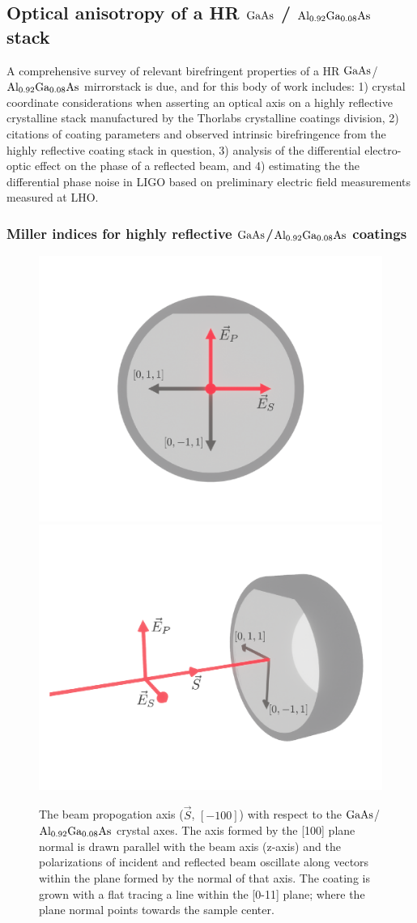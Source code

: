 \subsection{Optical anisotropy of a HR $\mathrm{GaAs}$ / $\mathrm{Al_{0.92}Ga_{0.08}As}$ stack}
A comprehensive survey of relevant birefringent properties of a HR $\mathrm{GaAs}$/$\mathrm{Al_{0.92}Ga_{0.08}As}$ mirrorstack is due, and for this body of work includes: 1) crystal coordinate considerations when asserting an optical axis on a highly reflective crystalline stack manufactured by the Thorlabs crystalline coatings division, 2) citations of coating parameters and observed intrinsic birefringence from the highly reflective coating stack in question, 3) analysis of the differential electro-optic effect on the phase of a reflected beam, and 4) estimating the the differential phase noise in LIGO based on preliminary electric field measurements measured at LHO.
\subsubsection{Miller indices for highly reflective $\mathrm{GaAs}$/$\mathrm{Al_{0.92}Ga_{0.08}As}$ coatings}

\begin{figure}[!hb]
    \begin{subcaptiongroup}
	    \includegraphics[width=.5\textwidth]{figs/ALGAAS/coating_orientation_normal.pdf}
	    \label{co_normal}
	    \includegraphics[width=.5\textwidth]{figs/ALGAAS/coating_orientation_isometric.pdf}
	    \label{co_iso}
    \end{subcaptiongroup}
\caption{The beam propogation axis ($\vec{S}$, $[-100]$) with respect to the $\mathrm{GaAs}$/$\mathrm{Al_{0.92}Ga_{0.08}As}$ crystal axes. The axis formed by the [100] plane normal is drawn parallel with the beam axis (z-axis) and the polarizations of incident and reflected beam oscillate along vectors within the plane formed by the normal of that axis. The coating is grown with a flat tracing a line within the [0-11] plane; where the plane normal points towards the sample center.}
\label{fig:algaas_coords}
\end{figure}

